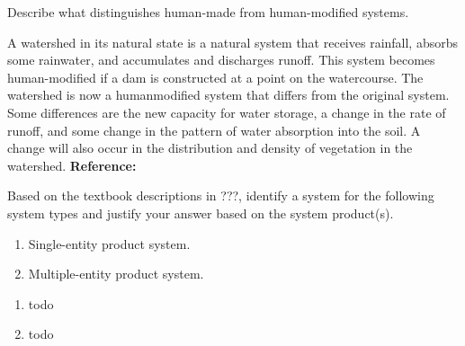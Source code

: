 \begin{exercises}
    \begin{exercise}
    \label{sea-02-03}
        Describe what distinguishes human-made from human-modified systems.
    \end{exercise}
    \begin{solution}
        A watershed in its natural state is a natural system that receives rainfall, absorbs some rainwater, and accumulates and discharges runoff. This system becomes human-modified if a dam is constructed at a point on the watercourse. The watershed is now a humanmodified system that differs from the original system. Some differences are the new capacity for water storage, a change in the rate of runoff, and some change in the pattern of water absorption into the soil. A change will also occur in the distribution and density of vegetation in the watershed. \textbf{Reference:}
    \end{solution}
    
    \begin{exercise}
    \label{sea-02-05_06}
        Based on the textbook descriptions in ???, identify a system for the following system types and justify your answer based on the system product(s).
        \begin{enumerate}[label=\alph*)]
            \item Single-entity product system.
            \item Multiple-entity product system.
        \end{enumerate}
    \end{exercise}
    \begin{solution}
        \begin{enumerate}[label=\alph*)]
            \item todo
            \item todo
        \end{enumerate}
    \end{solution}
    

\end{exercises}

